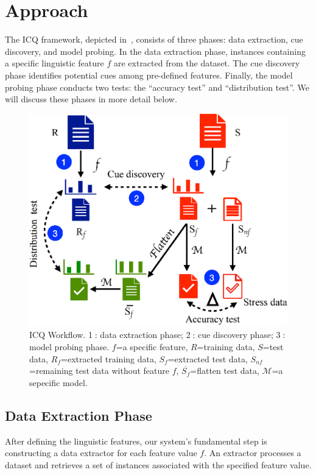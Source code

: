 \section{Approach}
\label{sec:approach}

The ICQ framework, depicted in~, 
consists of three phases: data extraction, cue discovery, and model probing. 
In the data extraction phase, instances containing a 
specific linguistic feature $f$ are extracted from the dataset. 
The cue discovery phase identifies potential cues among pre-defined features. 
Finally, the model probing phase conducts two tests: 
the ``accuracy test'' and ``distribution test''. 
We will discuss these phases in more detail below.

\begin{figure}[th]
\centering
\includegraphics[width=0.6\columnwidth]{picture/framework.eps}
\caption{ICQ Workflow. \textcircled{1}: data extraction phase; \textcircled{2}: cue discovery phase; 
\textcircled{3}: model probing phase. $f$=a specific feature, $R$=training data, $S$=test data, $R_f$=extracted training data, 
$S_f$=extracted test data, $S_{nf}$=remaining test data without feature $f$, $\overline{S_f}$=flatten test data, $\mathcal{M}$=a sepecific model.}
\label{fig:framework}
\end{figure}


\subsection{Data Extraction Phase}
\label{sec:evaldata}
After defining the linguistic features, our system's fundamental step 
is constructing a data extractor for each feature value $f$. 
An extractor processes a dataset and retrieves a set of 
instances associated with the specified feature value. 

